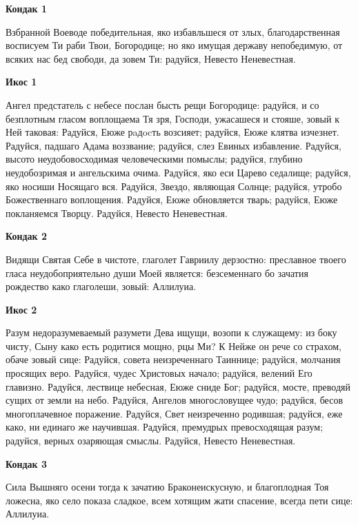 \mychapterending

 

\bfseries Кондак 1\normalfont{}

Взбранной Воеводе победительная, яко избавльшеся от злых, благодарственная восписуем Ти раби Твои, Богородице; но яко имущая державу непобедимую, от всяких нас бед свободи, да зовем Ти: радуйся, Невесто Неневестная.


\bfseries Икос 1\normalfont{}

Ангел предстатель с небесе послан бысть рещи Богородице: радуйся, и со безплотным гласом воплощаема Тя зря, Господи, ужасашеся и стояше, зовый к Ней таковая: Радуйся, Еюже рaдocть возсияет; радуйся, Еюже клятва изчезнет. Радуйся, падшаго Адама воззвание; радуйся, слез Евиных избавление. Радуйся, высото неудобовосходимая человеческими помыслы; радуйся, глубино неудобозримая и ангельскима очима. Радуйся, яко еси Царево седалище; радуйся, яко носиши Носящаго вся. Радуйся, Звездо, являющая Солнце; радуйся, утробо Божественнаго воплощения. Радуйся, Еюже обновляется тварь; радуйся, Еюже покланяемся Творцу. Радуйся, Невесто Неневестная.


\bfseries Кондак 2\normalfont{}

Видящи Святая Себе в чистоте, глаголет Гавриилу дерзостно: преславное твоего гласа неудобоприятельно души Моей является: безсеменнаго бо зачатия рождество како глаголеши, зовый: Аллилуиа.


\bfseries Икос 2\normalfont{}

Разум недоразумеваемый разумети Дева ищущи, возопи к служащему: из боку чисту, Сыну како есть родитися мощно, рцы Ми? К Нейже он рече со страхом, обаче зовый сице: Радуйся, совета неизреченнаго Таиннице; радуйся, молчания просящих веро. Радуйся, чудес Христовых начало; радуйся, велений Его главизно. Радуйся, лествице небесная, Еюже сниде Бог; радуйся, мосте, преводяй сущих от земли на небо. Радуйся, Ангелов многословущее чудо; радуйся, бесов многоплачевное поражение. Радуйся, Свет неизреченно родившая; радуйся, еже како, ни единаго же научившая. Радуйся, премудрых превосходящая разум; радуйся, верных озаряющая смыслы. Радуйся, Невесто Неневестная.


\bfseries Кондак 3\normalfont{}


Сила Вышняго осени тогда к зачатию Браконеискусную, и благоплодная Тоя ложесна, яко село показа сладкое, всем хотящим жати спасение, всегда пети сице: Аллилуиа.


